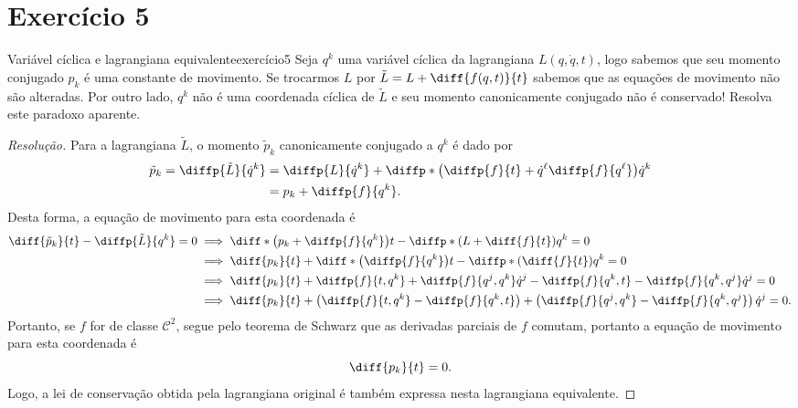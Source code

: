 \section*{Exercício 5}
\begin{exercício}{Variável cíclica e lagrangiana equivalente}{exercício5}
    Seja \(q^k\) uma variável cíclica da lagrangiana \(L(q,\dot{q}, t)\), logo sabemos que seu momento conjugado \(p_k\) é uma constante de movimento. Se trocarmos \(L\) por \(\tilde{L} = L + \diff{f(q,t)}{t}\) sabemos que as equações de movimento não são alteradas. Por outro lado, \(q^k\) não é uma coordenada cíclica de \(\tilde{L}\) e seu momento canonicamente conjugado não é conservado! Resolva este paradoxo aparente.
\end{exercício}
\begin{proof}[Resolução]
    Para a lagrangiana \(\tilde{L}\), o momento \(\tilde{p}_k\) canonicamente conjugado a \(q^k\) é dado por
    \begin{align*}
        \tilde{p}_k = \diffp{\tilde{L}}{\dot{q}^k} &= \diffp{L}{\dot{q}^k} + \diffp*{\left(\diffp{f}{t} + \dot{q}^\ell\diffp{f}{q^\ell}\right)}{\dot{q}^k}\\
                                                   &= p_k + \diffp{f}{q^k}.
    \end{align*}
    Desta forma, a equação de movimento para esta coordenada é
    \begin{align*}
        \diff{\tilde{p}_k}{t} - \diffp{\tilde{L}}{q^k} = 0 &\implies \diff*{\left(p_k + \diffp{f}{q^k}\right)}{t} - \diffp*{\left(L + \diff{f}{t}\right)}{q^k} = 0\\
                                                           &\implies \diff{p_k}{t} + \diff*{\left(\diffp{f}{q^k}\right)}{t} - \diffp*{\left(\diff{f}{t}\right)}{q^k} = 0\\
                                                           &\implies \diff{p_k}{t} + \diffp{f}{t,q^k} + \diffp{f}{q^j,q^k}\dot{q}^j - \diffp{f}{q^k,t} - \diffp{f}{q^k,q^j}\dot{q}^j = 0\\
                                                           &\implies \diff{p_k}{t} + \left(\diffp{f}{t,q^k} - \diffp{f}{q^k,t}\right) + \left(\diffp{f}{q^j,q^k} - \diffp{f}{q^k,q^j}\right)\dot{q}^j= 0.
    \end{align*}
    Portanto, se \(f\) for de classe \(\mathcal{C}^2\), segue pelo teorema de Schwarz que as derivadas parciais de \(f\) comutam, portanto a equação de movimento para esta coordenada é
    \begin{equation*}
        \diff{p_k}{t} = 0.
    \end{equation*}
    Logo, a lei de conservação obtida pela lagrangiana original é também expressa nesta lagrangiana equivalente.
\end{proof}
